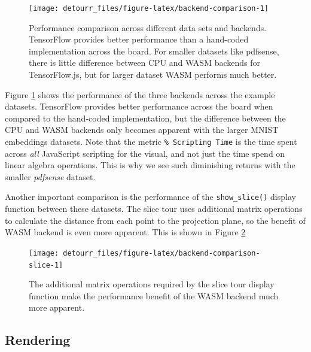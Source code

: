 \begin{Schunk}
\begin{figure}
\texttt{[image: detourr\_files/figure-latex/backend-comparison-1]} \caption[Performance comparison across different data sets and backends]{Performance comparison across different data sets and backends. TensorFlow provides better performance than a hand-coded implementation across the board. For smaller datasets like pdfsense, there is little difference between CPU and WASM backends for TensorFlow.js, but for larger dataset WASM performs much better.}\label{fig:backend-comparison}
\end{figure}
\end{Schunk}

Figure \ref{fig:backend-comparison} shows the performance of the three
backends across the example datasets. TensorFlow provides better
performance across the board when compared to the hand-coded
implementation, but the difference between the CPU and WASM backends
only becomes apparent with the larger MNIST embeddings datasets. Note
that the metric \texttt{\%\ Scripting\ Time} is the time spent across
\emph{all} JavaScript scripting for the visual, and not just the time
spend on linear algebra operations. This is why we see such diminishing
returns with the smaller \emph{pdfsense} dataset.

Another important comparison is the performance of the
\texttt{show\_slice()} display function between these datasets. The
slice tour uses additional matrix operations to calculate the distance
from each point to the projection plane, so the benefit of WASM backend
is even more apparent. This is shown in Figure
\ref{fig:backend-comparison-slice}

\begin{Schunk}
\begin{figure}
\texttt{[image: detourr\_files/figure-latex/backend-comparison-slice-1]} \caption[The additional matrix operations required by the slice tour display function make the performance benefit of the WASM backend much more apparent]{The additional matrix operations required by the slice tour display function make the performance benefit of the WASM backend much more apparent.}\label{fig:backend-comparison-slice}
\end{figure}
\end{Schunk}

\hypertarget{rendering}{%
\subsection{Rendering}\label{rendering}}


